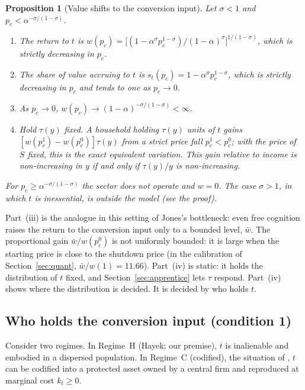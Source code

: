 \documentclass[12pt]{article}
\newtheorem{proposition}{Proposition}
\theoremstyle{remark}
\begin{document}
\begin{proposition}[Value shifts to the conversion input]\label{prop:valueshift}
Let $\sigma<1$ and $p_c<\alpha^{-\sigma/(1-\sigma)}$.
\begin{enumerate}[label=(\roman*),itemsep=0pt]
\item The return to $t$ is $w(p_c)=\big[(1-\alpha^\sigma p_c^{1-\sigma})/(1-\alpha)^\sigma\big]^{1/(1-\sigma)}$, which is strictly decreasing in $p_c$.
\item The share of value accruing to $t$ is $s_t(p_c)=1-\alpha^\sigma p_c^{1-\sigma}$, which is strictly decreasing in $p_c$ and tends to one as $p_c\to0$.
\item As $p_c\to0$, $w(p_c)\to(1-\alpha)^{-\sigma/(1-\sigma)}<\infty$.
\item Hold $\tau(y)$ fixed. A household holding $\tau(y)$ units of $t$ gains $[w(p_c^1)-w(p_c^0)]\tau(y)$ from a strict price fall $p_c^1<p_c^0$; with the price of $S$ fixed, this is the exact equivalent variation. This gain relative to income is non-increasing in $y$ if and only if $\tau(y)/y$ is non-increasing.
\end{enumerate}
For $p_c\ge\alpha^{-\sigma/(1-\sigma)}$ the sector does not operate and $w=0$. The case $\sigma>1$, in which $t$ is inessential, is outside the model (see the proof).
\end{proposition}

Part~(iii) is the analogue in this setting of Jones's bottleneck: even free cognition raises the return to the conversion input only to a bounded level, $\bar w$. The proportional gain $\bar w/w(p_c^0)$ is not uniformly bounded: it is large when the starting price is close to the shutdown price (in the calibration of Section~\ref{sec:quant}, $\bar w/w(1)=11.66$). Part~(iv) is static: it holds the distribution of $t$ fixed, and Section~\ref{sec:apprentice} lets $\tau$ respond. Part~(iv) shows where the distribution is decided. It is decided by who holds $t$.

\subsection{Who holds the conversion input (condition 1)}\label{sec:regime}

Consider two regimes. In Regime~H (Hayek; our premise), $t$ is inalienable and embodied in a dispersed population. In Regime~C (codified), the situation of \citet[\S12.4.3]{brynjolfsson2026hayek}, $t$ can be codified into a protected asset owned by a central firm and reproduced at marginal cost $k_t\ge0$.
\end{document}
